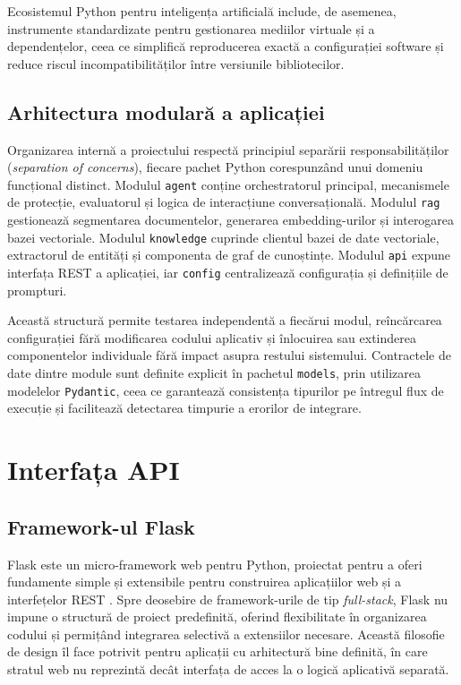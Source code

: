 \documentclass[12pt, a4paper, oneside, romanian]{teza-upb}
\begin{document}
Ecosistemul Python pentru inteligența artificială include, de asemenea, instrumente standardizate pentru gestionarea mediilor virtuale și a dependențelor, ceea ce simplifică reproducerea exactă a configurației software și reduce riscul incompatibilităților între versiunile bibliotecilor.

\subsection{Arhitectura modulară a aplicației}

Organizarea internă a proiectului respectă principiul separării responsabilităților (\textit{separation of concerns}), fiecare pachet Python corespunzând unui domeniu funcțional distinct. Modulul \texttt{agent} conține orchestratorul principal, mecanismele de protecție, evaluatorul și logica de interacțiune conversațională. Modulul \texttt{rag} gestionează segmentarea documentelor, generarea embedding-urilor și interogarea bazei vectoriale. Modulul \texttt{knowledge} cuprinde clientul bazei de date vectoriale, extractorul de entități și componenta de graf de cunoștințe. Modulul \texttt{api} expune interfața REST a aplicației, iar \texttt{config} centralizează configurația și definițiile de prompturi.

Această structură permite testarea independentă a fiecărui modul, reîncărcarea configurației fără modificarea codului aplicativ și înlocuirea sau extinderea componentelor individuale fără impact asupra restului sistemului. Contractele de date dintre module sunt definite explicit în pachetul \texttt{models}, prin utilizarea modelelor \texttt{Pydantic}, ceea ce garantează consistența tipurilor pe întregul flux de execuție și facilitează detectarea timpurie a erorilor de integrare.

\section{Interfața API}

\subsection{Framework-ul Flask}

Flask este un micro-framework web pentru Python, proiectat pentru a oferi fundamente simple și extensibile pentru construirea aplicațiilor web și a interfețelor REST \cite{flask_doc}. Spre deosebire de framework-urile de tip \textit{full-stack}, Flask nu impune o structură de proiect predefinită, oferind flexibilitate în organizarea codului și permițând integrarea selectivă a extensiilor necesare. Această filosofie de design îl face potrivit pentru aplicații cu arhitectură bine definită, în care stratul web nu reprezintă decât interfața de acces la o logică aplicativă separată.
\end{document}
